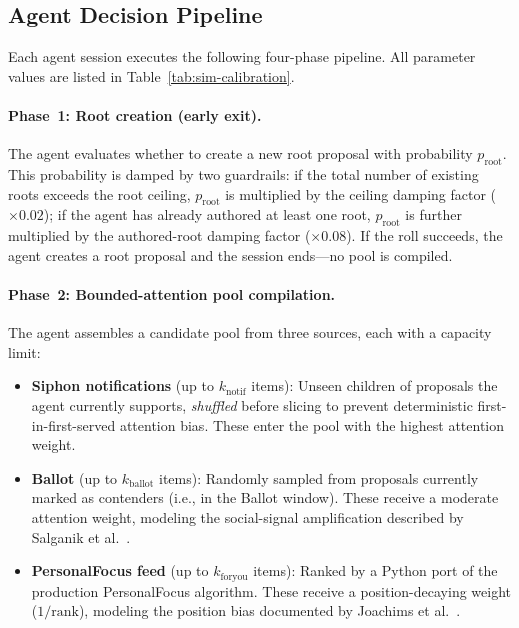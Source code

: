 \documentclass[a4paper, 12pt, twoside]{iviathesis}
\begin{document}
\subsection{Agent Decision Pipeline}
\label{sec:appendix-agent-pipeline}

Each agent session executes the following four-phase pipeline. All parameter values are listed in Table~\ref{tab:sim-calibration}.

\paragraph{Phase~1: Root creation (early exit).}
The agent evaluates whether to create a new root proposal with probability $p_{\text{root}}$. This probability is damped by two guardrails: if the total number of existing roots exceeds the root ceiling, $p_{\text{root}}$ is multiplied by the ceiling damping factor ($\times 0.02$); if the agent has already authored at least one root, $p_{\text{root}}$ is further multiplied by the authored-root damping factor ($\times 0.08$). If the roll succeeds, the agent creates a root proposal and the session ends---no pool is compiled.

\paragraph{Phase~2: Bounded-attention pool compilation.}
The agent assembles a candidate pool from three sources, each with a capacity limit:
\begin{itemize}
    \item \textbf{Siphon notifications} (up to $k_{\text{notif}}$ items): Unseen children of proposals the agent currently supports, \textit{shuffled} before slicing to prevent deterministic first-in-first-served attention bias. These enter the pool with the highest attention weight.
    \item \textbf{Ballot} (up to $k_{\text{ballot}}$ items): Randomly sampled from proposals currently marked as contenders (i.e., in the Ballot window). These receive a moderate attention weight, modeling the social-signal amplification described by Salganik et al.\ \cite{salganik2006experimental}.
    \item \textbf{PersonalFocus feed} (up to $k_{\text{foryou}}$ items): Ranked by a Python port of the production PersonalFocus algorithm. These receive a position-decaying weight ($1/\text{rank}$), modeling the position bias documented by Joachims et al.\ \cite{joachims2005accurately}.
\end{itemize}
\end{document}
